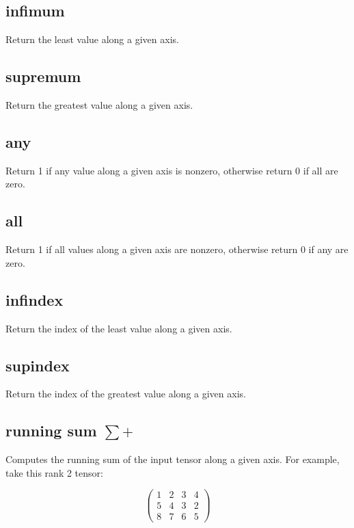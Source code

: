 \subsection{infimum}\label{Operation:infimum} Return the least value
along a given axis. 

\subsection{supremum}\label{Operation:supremum} Return the greatest value
along a given axis. 

\subsection{any}\label{Operation:any} Return 1 if any value
along a given axis is nonzero, otherwise return 0 if all are zero. 

\subsection{all}\label{Operation:all} Return 1 if all values
along a given axis are nonzero, otherwise return 0 if any are zero. 

\subsection{infindex}\label{Operation:infindex} Return the index of
the least value along a given axis.

\subsection{supindex}\label{Operation:supindex} Return the index of
the greatest value along a given axis.

\subsection{running sum $\sum+$}\label{Operation:runningSum} Computes
the running sum of the input tensor along a given axis. For example, take
this rank 2 tensor:

\begin{displaymath}
  \left(
  \begin{array}{cccc}
    1& 2& 3& 4 \\
    5& 4& 3& 2 \\
    8& 7& 6& 5
  \end{array}
  \right)
\end{displaymath}

